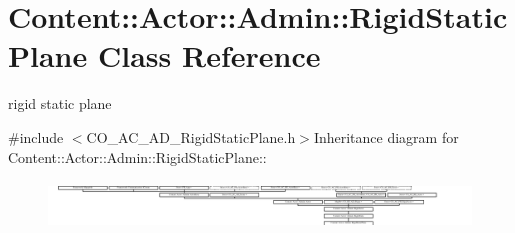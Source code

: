 \hypertarget{classContent_1_1Actor_1_1Admin_1_1RigidStaticPlane}{
\section{Content::Actor::Admin::RigidStaticPlane Class Reference}
\label{classContent_1_1Actor_1_1Admin_1_1RigidStaticPlane}
}


rigid static plane  


{\ttfamily \#include $<$CO\_\-AC\_\-AD\_\-RigidStaticPlane.h$>$}Inheritance diagram for Content::Actor::Admin::RigidStaticPlane::\begin{figure}[H]
\begin{center}
\leavevmode
\includegraphics[height=1.28834cm]{classContent_1_1Actor_1_1Admin_1_1RigidStaticPlane}
\end{center}
\end{figure}
